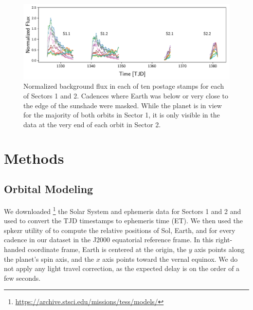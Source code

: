 \documentclass[modern]{aastex62}
\begin{document}
\begin{figure}[t!]
    \begin{centering}
    \includegraphics[width=\linewidth]{figures/data.pdf}
    \caption{\label{fig:data}
             Normalized background flux in each of ten postage stamps
             for each of Sectors 1 and 2. Cadences where Earth was
             below or very close to the edge of the sunshade were masked.
             While the planet is in view for the majority of both orbits
             in Sector 1, it is only visible in the data at the very end
             of each orbit in Sector 2.
             }
    \end{centering}
\end{figure}

\pagebreak

\section{Methods}%
\label{sec:methods}%
%
\subsection{Orbital Modeling}%
\label{sec:orbit}%
%
We downloaded%
\footnote{\url{https://archive.stsci.edu/missions/tess/models/}}
the Solar System and \TESS ephemeris data for
Sectors 1 and 2 and used \spiceypy \citep{Acton1996, Acton2017, Annex2017}
to convert the TJD timestamps to 
ephemeris time (ET). We then used the \textsf{spkezr} utility of \spiceypy to compute
the relative positions of Sol, Earth, and \TESS for every cadence
in our dataset in the J2000 equatorial reference frame. In this right-handed
coordinate frame, Earth is centered at the origin, the $y$ axis points along the 
planet's spin axis, and the $x$ axis points toward the vernal equinox. We
do not apply any light travel correction, as the expected delay is on the order
of a few seconds.
\end{document}
